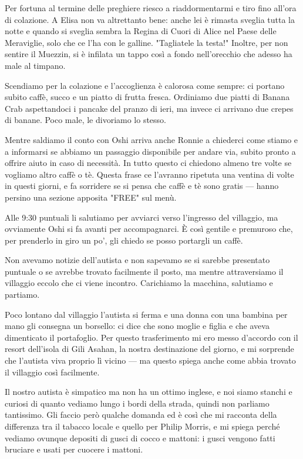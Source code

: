 Per fortuna al termine delle preghiere riesco a riaddormentarmi e tiro fino all'ora di colazione. A Elisa non va altrettanto bene: anche lei è rimasta sveglia tutta la notte e quando si sveglia sembra la Regina di Cuori di Alice nel Paese delle Meraviglie, solo che ce l'ha con le galline. "Tagliatele la testa!" Inoltre, per non sentire il Muezzin, si è infilata un tappo così a fondo nell'orecchio che adesso ha male al timpano.

Scendiamo per la colazione e l'accoglienza è calorosa come sempre: ci portano subito caffè, succo e un piatto di frutta fresca. Ordiniamo due piatti di Banana Crab aspettandoci i pancake del pranzo di ieri, ma invece ci arrivano due crepes di banane. Poco male, le divoriamo lo stesso.

Mentre saldiamo il conto con Oshi arriva anche Ronnie a chiederci come stiamo e a informarsi se abbiamo un passaggio disponibile per andare via, subito pronto a offrire aiuto in caso di necessità. In tutto questo ci chiedono almeno tre volte se vogliamo altro caffè o tè. Questa frase ce l'avranno ripetuta una ventina di volte in questi giorni, e fa sorridere se si pensa che caffè e tè sono gratis — hanno persino una sezione apposita "FREE" sul menù.

Alle 9:30 puntuali li salutiamo per avviarci verso l'ingresso del villaggio, ma ovviamente Oshi si fa avanti per accompagnarci. È così gentile e premuroso che, per prenderlo in giro un po', gli chiedo se posso portargli un caffè.

Non avevamo notizie dell'autista e non sapevamo se si sarebbe presentato puntuale o se avrebbe trovato facilmente il posto, ma mentre attraversiamo il villaggio eccolo che ci viene incontro. Carichiamo la macchina, salutiamo e partiamo.

Poco lontano dal villaggio l'autista si ferma e una donna con una bambina per mano gli consegna un borsello: ci dice che sono moglie e figlia e che aveva dimenticato il portafoglio. Per questo trasferimento mi ero messo d'accordo con il resort dell'isola di Gili Asahan, la nostra destinazione del giorno, e mi sorprende che l'autista viva proprio lì vicino — ma questo spiega anche come abbia trovato il villaggio così facilmente.

Il nostro autista è simpatico ma non ha un ottimo inglese, e noi siamo stanchi e curiosi di quanto vediamo lungo i bordi della strada, quindi non parliamo tantissimo. Gli faccio però qualche domanda ed è così che mi racconta della differenza tra il tabacco locale e quello per Philip Morris, e mi spiega perché vediamo ovunque depositi di gusci di cocco e mattoni: i gusci vengono fatti bruciare e usati per cuocere i mattoni.

